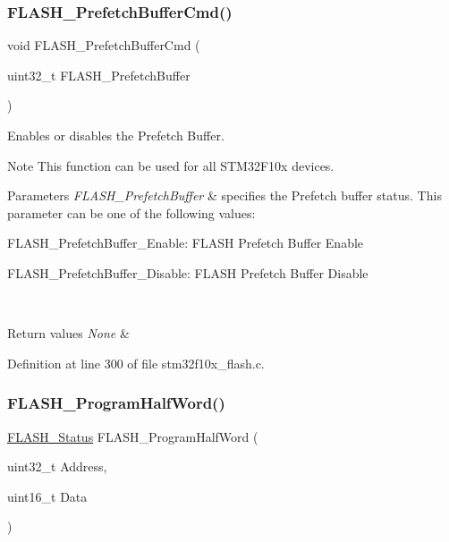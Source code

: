 \subsubsection{\texorpdfstring{F\+L\+A\+S\+H\+\_\+\+Prefetch\+Buffer\+Cmd()}{FLASH\_PrefetchBufferCmd()}}
{\footnotesize\ttfamily void F\+L\+A\+S\+H\+\_\+\+Prefetch\+Buffer\+Cmd (\begin{DoxyParamCaption}\item[{uint32\+\_\+t}]{F\+L\+A\+S\+H\+\_\+\+Prefetch\+Buffer }\end{DoxyParamCaption})}



Enables or disables the Prefetch Buffer. 

\begin{DoxyNote}{Note}
This function can be used for all S\+T\+M32\+F10x devices. 
\end{DoxyNote}

\begin{DoxyParams}{Parameters}
{\em F\+L\+A\+S\+H\+\_\+\+Prefetch\+Buffer} & specifies the Prefetch buffer status. This parameter can be one of the following values\+: \begin{DoxyItemize}
\item F\+L\+A\+S\+H\+\_\+\+Prefetch\+Buffer\+\_\+\+Enable\+: F\+L\+A\+SH Prefetch Buffer Enable \item F\+L\+A\+S\+H\+\_\+\+Prefetch\+Buffer\+\_\+\+Disable\+: F\+L\+A\+SH Prefetch Buffer Disable \end{DoxyItemize}
\\
\hline
\end{DoxyParams}

\begin{DoxyRetVals}{Return values}
{\em None} & \\
\hline
\end{DoxyRetVals}


Definition at line 300 of file stm32f10x\+\_\+flash.\+c.

\mbox{\label{group___f_l_a_s_h___exported___functions_ga5c1336f667950a8765887228f1d0d501}} 
\subsubsection{\texorpdfstring{F\+L\+A\+S\+H\+\_\+\+Program\+Half\+Word()}{FLASH\_ProgramHalfWord()}}
{\footnotesize\ttfamily \hyperlink{group___f_l_a_s_h___exported___types_gadc63a6f3404ff1f71229a66915e9cdc0}{F\+L\+A\+S\+H\+\_\+\+Status} F\+L\+A\+S\+H\+\_\+\+Program\+Half\+Word (\begin{DoxyParamCaption}\item[{uint32\+\_\+t}]{Address,  }\item[{uint16\+\_\+t}]{Data }\end{DoxyParamCaption})}



